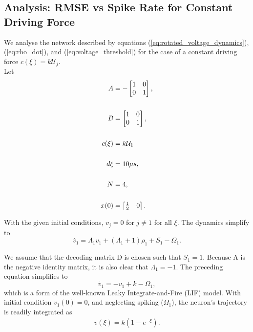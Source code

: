 \subsection{Analysis: RMSE vs Spike Rate for Constant Driving Force}

We analyse the network described by equations (\ref{eq:rotated_voltage_dynamics}), (\ref{eq:rho_dot}), and (\ref{eq:voltage_threshold}) for the case of a constant driving force $c(\xi) = k \mathcal{U}_j$. \\

Let 
\begin{align*}
A &= -\begin{bmatrix}  
1 & 0 \\
0 & 1
\end{bmatrix},\notag \\
\notag \\
B &= \begin{bmatrix}  
1 & 0 \\
0 & 1
\end{bmatrix}, \notag \\
\notag \\
c(\xi) &= k \mathcal{U}_1 \\
\notag \\
d\xi &= 10 \mu s,\notag \\
\notag \\
N &= 4,\notag \\
\notag \\
x(0) &= \begin{bmatrix} \frac{1}{2} & 0 \end{bmatrix}.\notag 
\end{align*}

With the given initial conditions, $v_j = 0$ for $j \neq 1$ for all $\xi$. The dynamics simplify to 
\begin{equation*}
\label{eq:simple_voltage_dynamics_constant_driving}
\dot{v_1} = \Lambda_1 v_1 + (\Lambda_1 + 1)\rho_1 + S_1 - \Omega_1.
\end{equation*}

We assume that the decoding matrix D is chosen such that $S_1 = 1$. Because A is the negative identity matrix, it is also clear that $\Lambda_1 = -1$. The preceding equation simplifies to  
\begin{equation}
\label{eq:simple_voltage_dynamics_constant_driving}
\dot{v_1} = -v_1 + k - \Omega_1,
\end{equation}
which is a form of the well-known Leaky Integrate-and-Fire (LIF) model. With initial condition $v_1(0) = 0$,  and neglecting spiking ($\Omega_1$), the neuron's trajectory is readily integrated as
\begin{align*}
v(\xi) = k (1 - e^{-\xi}).
\end{align*}

